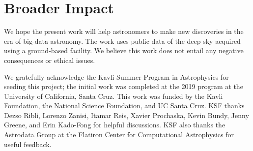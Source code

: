 \documentclass{article}
\begin{document}
\section*{Broader Impact}

We hope the present work will help astronomers to make new discoveries in the era of big-data astronomy. 
The work uses public data of the deep sky acquired using a ground-based facility. 
We believe this work does not entail any negative consequences or ethical issues.

\begin{ack}
We gratefully acknowledge the Kavli Summer Program in Astrophysics for seeding this project; the initial work was completed at the 2019 program at the University of California, Santa Cruz.
This work was funded by the Kavli Foundation, the National Science Foundation, and UC Santa Cruz.
KSF thanks Dezso Ribli, Lorenzo Zanisi, Itamar Reis, Xavier Prochaska, Kevin Bundy, Jenny Greene, and Erin Kado-Fong for helpful discussions.
KSF also thanks the Astrodata Group at the Flatiron Center for Computational Astrophysics for useful feedback.
\end{ack}



\end{document}
